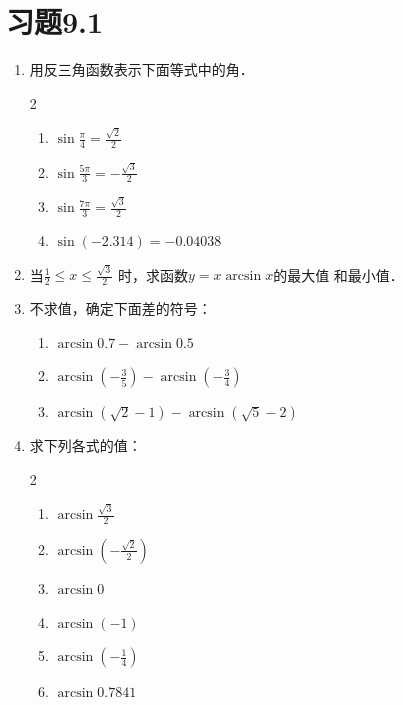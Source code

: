\section*{习题9.1}
\begin{enumerate}
    \item 用反三角函数表示下面等式中的角．
    \begin{multicols}{2}
\begin{enumerate}
    \item $\sin\frac{\pi}{4}=\frac{\sqrt{2}}{2}$
    \item $\sin\frac{5\pi}{3}=-\frac{\sqrt{3}}{2}$
    \item $\sin\frac{7\pi}{3}=\frac{\sqrt{3}}{2}$
    \item $\sin(-2.314)=-0.04038$
\end{enumerate}
    \end{multicols}
    \item 当$\frac{1}{2}\le x\le\frac{\sqrt{3}}{2}$
    时，求函数$y=x\arcsin x$的最大值
    和最小值．
    \item 不求值，确定下面差的符号：
\begin{enumerate}
    \item $\arcsin 0.7-\arcsin 0.5$
    \item $\arcsin\left(-\frac{3}{5}\right)-\arcsin\left(-\frac{3}{4}\right)$
    \item $\arcsin\left(\sqrt{2}-1\right)-\arcsin\left(\sqrt{5}-2\right)$
\end{enumerate}
\item 求下列各式的值：
\begin{multicols}{2}
\begin{enumerate}
    \item $\arcsin\frac{\sqrt{3}}{2}$
    \item $\arcsin\left(-\frac{\sqrt{2}}{2}\right)$
    \item $\arcsin0$
    \item $\arcsin(-1)$
    \item $\arcsin\left(-\frac{1}{4}\right)$
    \item $\arcsin0.7841$
\end{enumerate}
\end{multicols}


\end{enumerate}
